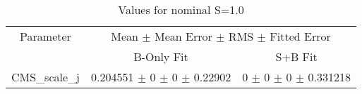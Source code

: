 \begin{table}
\centering
\caption{Values for nominal S=1.0}
\begin{tabular}{ccc}
\toprule
Parameter 	& \multicolumn{2}{c}{Mean $\pm$ Mean Error $\pm$ RMS $\pm$ Fitted Error}\\
 	& B-Only Fit & S+B Fit\\
\midrule
CMS\_scale\_j 	& \num{0.204551} $\pm$ \num{0} $\pm$ \num{0} $\pm$ \num{0.22902} 	& \num{0} $\pm$ \num{0} $\pm$ \num{0} $\pm$ \num{0.331218}\\
\bottomrule
\end{tabular}
\end{table}